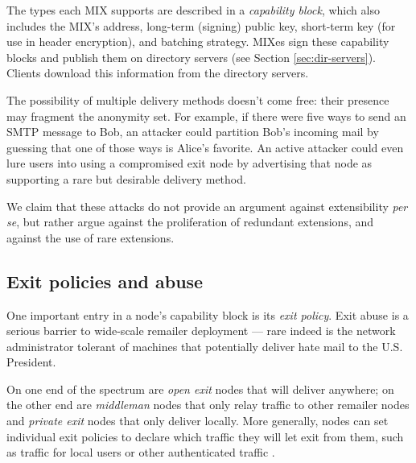 \documentclass{llncs}
\begin{document}
The types each MIX supports are described in a \emph{capability block},
which also includes the MIX's address, long-term (signing) public key,
short-term key (for use in header encryption), and batching strategy.
MIXes sign these capability blocks
and publish them on directory servers (see Section \ref{sec:dir-servers}).
Clients download this information from the directory servers.

%

The possibility of multiple delivery methods doesn't come free: their
presence may fragment the anonymity set.  For example, if there were five
ways to send an SMTP message to Bob, an attacker could partition Bob's
incoming mail by guessing that one of those ways is Alice's favorite.
An active attacker could even lure users into using a compromised
exit node by advertising that node as supporting a
rare but desirable delivery method.

We claim that these attacks do not provide an argument against
extensibility \emph{per se}, but rather argue against the proliferation
of redundant extensions, and against the use of rare extensions.  

\subsection{Exit policies and abuse}
\label{subsec:exitpolicies}

One important entry in a node's capability block is its \emph{exit
policy}. Exit abuse is a serious barrier to wide-scale remailer deployment
--- rare indeed is the network administrator tolerant of machines that
potentially deliver hate mail to the U.S. President.

On one end of the spectrum are \emph{open exit} nodes that will
deliver anywhere; on the other end are \emph{middleman} nodes that
only relay traffic to other remailer nodes and \emph{private exit}
nodes that only deliver locally. More generally, nodes can set
individual exit policies to declare which traffic they will let exit
from them, such as traffic for local users or other authenticated
traffic \cite{onion-discex00}.
\end{document}
